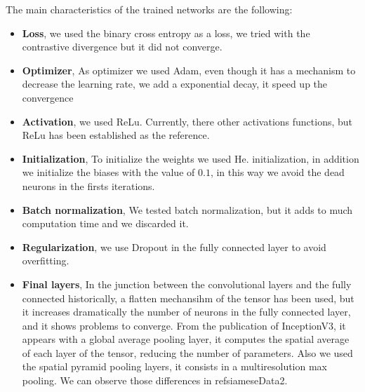 The main characteristics of the trained networks are the following:

\begin{itemize}

\item \textbf{Loss}, we used the binary cross entropy as a loss, we tried with the contrastive divergence but it did not converge.

\item \textbf{Optimizer}, As optimizer we used Adam, even though it has a mechanism to decrease the learning rate, we add a exponential decay, it speed up the convergence

\item \textbf{Activation}, we used ReLu. Currently, there other activations functions, but ReLu has been established as the reference.

\item \textbf{Initialization}, To initialize the weights we used He. initialization, in addition we initialize the biases with the value of $0.1$, in this way we avoid the dead neurons in the firsts iterations.

\item \textbf{Batch normalization}, We tested batch normalization, but it adds to much computation time and we discarded it.

\item \textbf{Regularization}, we use Dropout in the fully connected layer to avoid overfitting.


\item \textbf{Final layers}, In the junction between the convolutional layers and the fully connected historically, a flatten mechansihm of the tensor has been used, but it increases dramatically the number of neurons in the fully connected layer, and it shows problems to converge. From the publication of InceptionV3, it appears with a global average pooling layer, it computes the spatial average of each layer of the tensor, reducing the number of parameters. Also we used the spatial pyramid pooling layers, it consists in a multiresolution max pooling. We can observe those differences in ref{siameseData2}.

\begin{figure}[H]
		
\centering


\end{figure}
\end{itemize}
